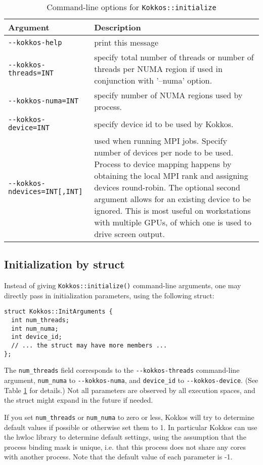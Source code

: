 \begin{table}
\caption{Command-line options for \lstinline|Kokkos::initialize|}
\label{TBL:CommandLineOptions}
\begin{small}
\begin{tabular}[t]{lp{}}
\hline
Argument & Description \\\hline
\lstinline|--kokkos-help| & print this message \\
\lstinline|--kokkos-threads=INT| & 
specify total number of threads or number of threads per NUMA region if used in conjunction with '--numa' option. \\
\lstinline|--kokkos-numa=INT| & specify number of NUMA regions used by process. \\
\lstinline|--kokkos-device=INT| & specify device id to be used by Kokkos. \\
\lstinline|--kokkos-ndevices=INT[,INT]| & used when running MPI jobs. Specify number of
devices per node to be used. Process to device
mapping happens by obtaining the local MPI rank
and assigning devices round-robin. The optional
second argument allows for an existing device
to be ignored. This is most useful on workstations
with multiple GPUs, of which one is used to drive
screen output.\\
\hline
\end{tabular}
\end{small}
\end{table}

\subsection{Initialization by struct}\label{S:init:struct}

Instead of giving \lstinline|Kokkos::initialize()| command-line arguments,
one may directly pass in initialization parameters, using the following struct:
\begin{lstlisting}
struct Kokkos::InitArguments {
  int num_threads;
  int num_numa;
  int device_id;
  // ... the struct may have more members ...
};
\end{lstlisting}
The \lstinline|num_threads| field corresponds to the \verb!--kokkos-threads! command-line argument,
\lstinline|num_numa| to \verb!--kokkos-numa!, and \lstinline|device_id| to \verb!--kokkos-device!.
(See Table \ref{TBL:CommandLineOptions} for details.)
Not all parameters are observed by all execution spaces, and the struct might expand in the future if needed.

If you set \lstinline|num_threads| or \lstinline|num_numa| to zero or less, 
Kokkos will try to determine default values if possible or otherwise set them to 1.
In particular Kokkos can use the hwloc library to determine default settings, using the assumption that the process binding mask is unique, i.e. that this process does not share any cores with another process.
Note that the default value of each parameter is -1.

